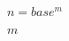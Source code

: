 \documentclass{article}
\begin{document}
$ n=base^{m} $
\pagebreak

$ m $
\pagebreak
\end{document}
